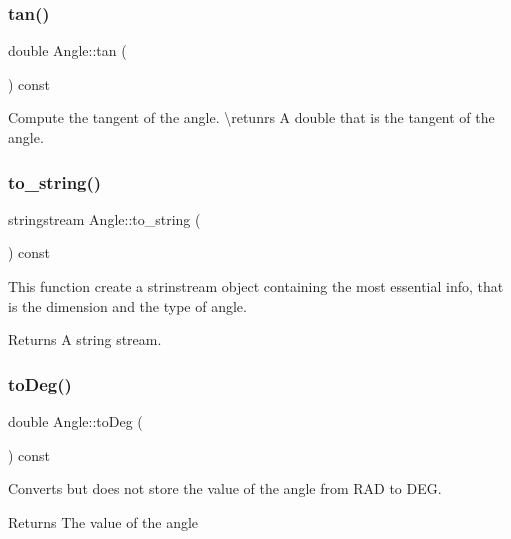 \subsubsection{\texorpdfstring{tan()}{tan()}}
{\footnotesize\ttfamily double Angle\+::tan (\begin{DoxyParamCaption}{ }\end{DoxyParamCaption}) const\hspace{0.3cm}{\ttfamily [inline]}}



Compute the tangent of the angle. \textbackslash{}retunrs A {\ttfamily double} that is the tangent of the angle. 

\mbox{\label{class_angle_a30cf6acb380ac16fbf308032a109dcd4}} 
\subsubsection{\texorpdfstring{to\_string()}{to\_string()}}
{\footnotesize\ttfamily stringstream Angle\+::to\+\_\+string (\begin{DoxyParamCaption}{ }\end{DoxyParamCaption}) const\hspace{0.3cm}{\ttfamily [inline]}}

This function create a strinstream object containing the most essential info, that is the dimension and the type of angle. \begin{DoxyReturn}{Returns}
A string stream. 
\end{DoxyReturn}
\mbox{\label{class_angle_a89b1e5b7b71fc1bf9565da0bef8f361f}} 
\subsubsection{\texorpdfstring{toDeg()}{toDeg()}}
{\footnotesize\ttfamily double Angle\+::to\+Deg (\begin{DoxyParamCaption}{ }\end{DoxyParamCaption}) const\hspace{0.3cm}{\ttfamily [inline]}}



Converts but does not store the value of the angle from R\+AD to D\+EG. 

\begin{DoxyReturn}{Returns}
The value of the angle 
\end{DoxyReturn}
\mbox{\label{class_angle_ad471cb182722fd7c44cba5aca446ed2c}} 
